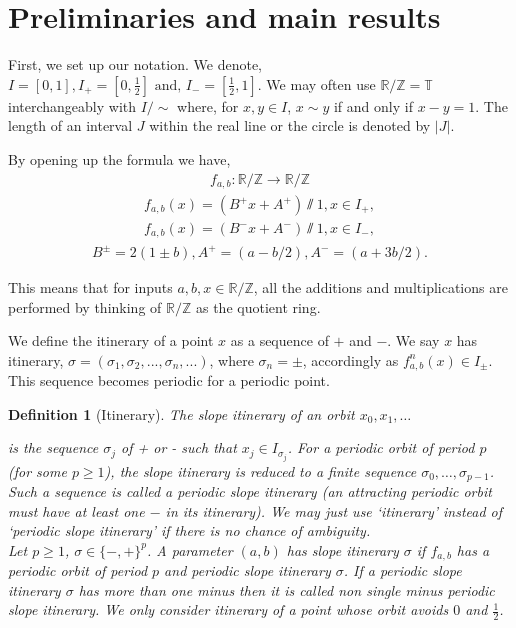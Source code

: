 \documentclass[12pt]{amsart}
\numberwithin{equation}{section}
\newtheorem{definition}[theorem]{Definition}
\theoremstyle{remark}
\begin{document}
\section{Preliminaries and main results}

First, we set up our notation. We denote, $I=[0,1], I_+= [ 0, \frac{1}{2} ]\text{ and, }I_-=[ \frac{1}{2},1].$ We may often use $\mathbb{R}/\mathbb{Z}=\mathbb{T}$ interchangeably with $I/\sim$ where, for $x,y \in I$, $x\sim y$ if and only if $x-y=1$. The length of an interval $J$ within the real line or the circle is denoted by $|J|$.

 By opening up the formula we have,
\begin{align*}
         f_{a,b}: \mathbb{R/Z} \to \mathbb{R/ Z} 
     \end{align*}
    \begin{align*}
      f_{a,b}(x)=(B^+x+A^+)\sslash1,x \in I_+,
\end{align*}
\begin{align*}
     f_{a,b}(x)=(B^-x+A^-)\sslash1,x \in I_-,
\end{align*}
\begin{align*}
    B^\pm = 2(1 \pm b),A^+ = (a-b/2),A^-=(a+3b/2).
\end{align*}

This means that for inputs $a,b,x \in \mathbb{R/Z}$, all the additions and multiplications are performed by thinking of $\mathbb{R/Z}$ as the  quotient ring.

\vspace{.25cm}

We define the itinerary of a point $x$ as a sequence of $+$ and $-$.  We say $x$ has itinerary,  $\sigma=(\sigma_1,\sigma_2,...,\sigma_n,...) $, where $\sigma_n=\pm $, accordingly as $f_{a,b}^n(x)\in I_{\pm}$. This sequence becomes periodic for a periodic point. 

\begin{definition}[Itinerary]
 The slope itinerary of an orbit $x_0, x_1, \ldots$  
 
 is the
 sequence $\sigma_j$ of + or - such that
 $x_j \in  I_{\sigma_j} $.  For a periodic orbit of period $p$ (for some $p \geq 1$), the slope itinerary is reduced to a
finite sequence $\sigma_0,\ldots,\sigma_{p-1}$. Such a sequence is called a periodic slope itinerary  (an attracting periodic orbit must have at least one $-$ in its itinerary). We may just use `itinerary' instead of `periodic slope itinerary' if there is no chance of ambiguity.  \\
 \indent
    Let $p \geq 1$, $\sigma \in \{-,+\}^p $. A parameter $(a,b)$ has slope itinerary
$\sigma$ if $f_{a,b}$ has a periodic orbit of period $p$ and periodic slope itinerary $\sigma$. If a periodic slope itinerary $\sigma$ has more than one minus then it is called non single minus periodic slope itinerary. We only consider itinerary of a point whose orbit avoids $0$ and $\frac{1}{2}$. 
\end{definition}
\end{document}
